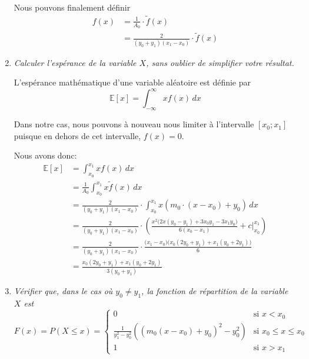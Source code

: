 \documentclass[a4paper,11pt]{report}
\begin{document}
\begin{enumerate}[\indent a)]
Nous pouvons finalement définir
\begin{align*}
	f(x) &= \frac{1}{A_0} \cdot  \tilde{f}(x) \\
	     &= \frac{2}{(y_0 + y_1)(x_1 - x_0)} \cdot \tilde{f}(x)
\end{align*}

\item {\em Calculer l'espérance de la variable $X$, sans oublier de simplifier votre résultat.}

L'espérance mathématique d'une variable aléatoire est définie par
\begin{equation*}
	\mathbb{E}[x] = \int_{-\infty}^{\infty} x f(x) \,dx
\end{equation*}

Dans notre cas, nous pouvons à nouveau nous limiter à l'intervalle $[x_{0}; x_{1}]$ puisque en dehors de cet intervalle, $f(x)=0$.

Nous avons donc:
\begingroup
\addtolength{\jot}{1em}
\begin{align*}
\mathbb{E}[x] &= \int_{x_0}^{x_1} x f(x) \,dx \\
	&= \frac{1}{A_0} \int_{x_0}^{x_1} x \tilde{f}(x) \,dx \\
	&= \frac{2}{(y_0 + y_1)(x_1 - x_0)} \cdot \int_{x_0}^{x_1} x (m_0 \cdot (x - x_0) + y_0) \,dx \\
	&= \frac{2}{(y_0 + y_1)(x_1 - x_0)} \cdot \left( \frac{x^2 \big(2x (y_0-y_1) + 3 x_0 y_1 - 3 x_1 y_0\big)}{6 (x_0-x_1)}+c \biggr\rvert^{x_1}_{x_0} \right) \\
	&= \frac{2}{(y_0 + y_1)(x_1 - x_0)} \cdot \frac{\big(x_1-x_0\big) \big(x_0 (2 y_0+y_1)+x_1 (y_0+2 y_1)\big)}{6} \\
	&= \frac{x_0 (2y_0 + y_1) + x_1 (y_0 + 2y_1)}{3 (y_0+y_1)}
\end{align*}
\endgroup

\item {\em Vérifier que, dans le cas où $y_{0} \neq y_{1}$, la fonction de répartition de la variable $X$ est}
\begin{equation*}
	F(x) = P(X \leq x) = \left\lbrace \begin{array}{ll}
		0						& \text{si $x < x_0$} \\
		\frac{1}{y^2_1 - y^2_0} \left( \left( m_0 \left( x - x_0 \right) + y_0 \right)^2 - y^2_0 \right)	& \text{si $x_0 \leq x \leq x_0$} \\
		1 						& \text{si $x > x_1$}
	\end{array} \right.
\end{equation*}


\end{enumerate}
\end{document}
